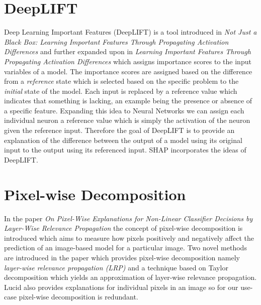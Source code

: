 \section{DeepLIFT}
Deep Learning Important Features (DeepLIFT) is a tool introduced in \emph{Not Just a Black Box: Learning Important Features Through Propagating Activation Differences} \cite{DBLP:journals/corr/ShrikumarGSK16} and further expanded upon in \emph{Learning Important Features Through Propagating Activation Differences} \cite{DBLP:journals/corr/ShrikumarGK17} which assigns importance scores to the input variables of a model. The importance scores are assigned based on the difference from a \emph{reference} state which is selected based on the specific problem to the \emph{initial} state of the model. Each input is replaced by a reference value which indicates that something is lacking, an example being the presence or absence of a specific feature. Expanding this idea to Neural Networks we can assign each individual neuron a reference value which is simply the activation of the neuron given the reference input. Therefore the goal of DeepLIFT is to provide an explanation of the difference between the output of a model using its original input to the output using its referenced input. SHAP incorporates the ideas of DeepLIFT.
\section{Pixel-wise Decomposition}
In the paper \emph{On Pixel-Wise Explanations for Non-Linear Classifier Decisions by Layer-Wise Relevance Propagation} \cite{Bach2015OnPropagation} the concept of pixel-wise decomposition is introduced which aims to measure how pixels positively and negatively affect the prediction of an image-based model for a particular image. Two novel methods are introduced in the paper which provides pixel-wise decomposition namely \emph{layer-wise relevance propagation (LRP)} and a technique based on Taylor decomposition \cite{DBLP:journals/corr/MontavonBBSM15} which yields an approximation of layer-wise relevance propagation. Lucid also provides explanations for individual pixels in an image so  for our use-case pixel-wise decomposition is redundant.

